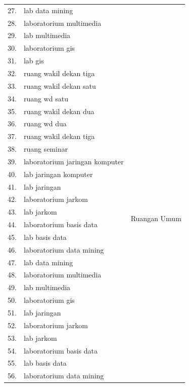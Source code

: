 \begin{enumerate}
\begin{longtable}{| m{1cm} | m{6cm} | m{3cm} |}
		27.	& lab data mining					& \\ \cline{1-2}
		28. & laboratorium multimedia			& \\ \cline{1-2}
		29.	& lab multimedia					& \\ \cline{1-2}
		30.	& laboratorium gis					& \\ \cline{1-2}
		31.	& lab gis							& \\ 
		\hline
		32.	& ruang wakil dekan tiga & \multirow{24}{*}{Ruangan Umum} \\ \cline{1-2}
		33.  & ruang wakil dekan satu			& \\ \cline{1-2}
		34.	& ruang wd satu						& \\ \cline{1-2}
		35.	& ruang wakil dekan dua				& \\ \cline{1-2}
		36.	& ruang wd dua						& \\ \cline{1-2}
		37.	& ruang wakil dekan tiga			& \\ \cline{1-2}
		38.	& ruang seminar						& \\ \cline{1-2}
		39.	& laboratorium jaringan komputer	& \\ \cline{1-2}
		40.	& lab jaringan komputer				& \\ \cline{1-2}
		41. & lab jaringan						& \\ \cline{1-2}
		42.	& laboratorium jarkom				& \\ \cline{1-2}
		43.	& lab jarkom						& \\ \cline{1-2}
		44.	& laboratorium basis data			& \\ \cline{1-2}
		45.	& lab basis data					& \\ \cline{1-2}
		46.	& laboratorium data mining			& \\ \cline{1-2}
		47.	& lab data mining					& \\ \cline{1-2}
		48. & laboratorium multimedia			& \\ \cline{1-2}
		49.	& lab multimedia					& \\ \cline{1-2}
		50.	& laboratorium gis					& \\ \cline{1-2}
		51. & lab jaringan						& \\ \cline{1-2}
		52.	& laboratorium jarkom				& \\ \cline{1-2}
		53.	& lab jarkom						& \\ \cline{1-2}
		54.	& laboratorium basis data			& \\ \cline{1-2}
		55.	& lab basis data					& \\ \cline{1-2}
		56.	& laboratorium data mining			& \\ 
        \hline
    \end{longtable}
	

\end{enumerate}
